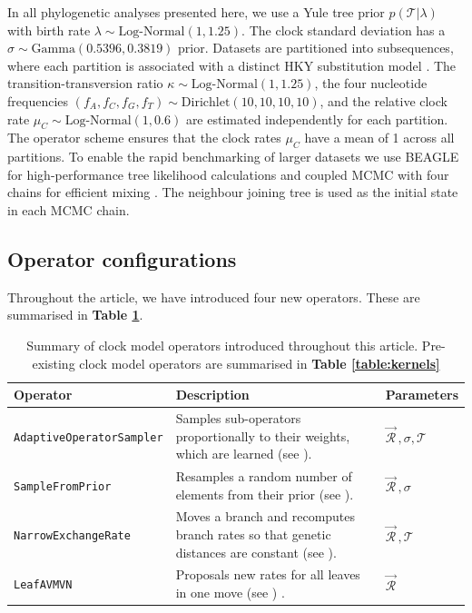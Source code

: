 \documentclass[10pt,letterpaper]{article}
\begin{document}
In all phylogenetic analyses presented here, we use a Yule \cite{yule1925ii} tree prior $p(\mathcal{T}|\lambda)$ with birth rate $\lambda \sim \text{Log-Normal}(1,1.25)$.
The clock standard deviation has a $\sigma \sim \text{Gamma}(0.5396,0.3819)$ prior.
Datasets are partitioned into subsequences, where each partition is associated with a distinct HKY substitution model \cite{hasegawa1985dating}.
The transition-transversion ratio $\kappa \sim \text{Log-Normal}(1, 1.25)$, the four nucleotide frequencies $(f_A, f_C, f_G, f_T) \sim \text{Dirichlet}(10,10,10,10)$, and the relative clock rate $\mu_C \sim \text{Log-Normal}(1, 0.6)$ are estimated independently for each partition.
The operator scheme ensures that the clock rates $\mu_C$ have a mean of 1 across all partitions. 
To enable the rapid benchmarking of larger datasets we use BEAGLE for high-performance tree likelihood calculations \cite{ayres2012beagle} and coupled MCMC with four chains for efficient mixing \cite{muller2019coupled}.
The neighbour joining tree \cite{saitou1987neighbor} is used as the initial state in each MCMC chain.



\subsection*{Operator configurations} \label{sect:operatorSchemes}


Throughout the article, we have introduced four new operators. 
These are summarised in \textbf{Table \ref{table:newOperators}}.


\begin{table}[h!]
\centering
\begin{tabular}{l p{4cm} l} 
 Operator & Description & Parameters  \\
  \hline
 \texttt{AdaptiveOperatorSampler} & Samples sub-operators proportionally to their weights, which are learned (see \nameref{sect:adaptiveSampling}). & $\vec{\mathcal{R}}^{\,}, \sigma, \mathcal{T}$ \\
  \hline
 \texttt{SampleFromPrior} & Resamples a random number of elements from their prior (see \nameref{sect:adaptiveSampling}). & $\vec{\mathcal{R}}^{\,}, \sigma$ \\
  \hline
 \texttt{NarrowExchangeRate} & Moves a branch and recomputes branch rates so that genetic distances are constant (see \nameref{sect:NER}). & $\vec{\mathcal{R}}^{\,}, \mathcal{T}$\\
  \hline
 \texttt{LeafAVMVN}  & Proposals new rates for all leaves in one move (see \nameref{AVMVN_sect}) \cite{baele2017adaptive}. & $\vec{\mathcal{R}}^{\,}$ \\
\end{tabular}
\caption{Summary of clock model operators introduced throughout this article. Pre-existing clock model operators are summarised in \textbf{Table \ref{table:kernels}}}
\label{table:newOperators}
\end{table}
\end{document}

